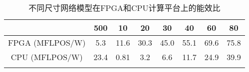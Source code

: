 \begin{center}
	\begin{table}[ht]
	\caption{不同尺寸网络模型在FPGA和CPU计算平台上的能效比}
	\renewcommand\arraystretch{1.2}
	\setlength{\tabcolsep}{12pt}
		\begin{tabular}{cccccccc}
	\toprule
						&	500		&	10		&	20		&	30		&	40		&	60		&	80		\\	\midrule
		FPGA (MFLPOS/W)	&	5.3		&	11.6	&	30.3	&	45.0	&	55.1	&	69.6	&	75.8	 \\	\hline
		CPU  (MFLPOS/W)	&	23.4	&	0.81	&	3.2		&	6.6		&	11.7	&	24.9	&	39.9	\\	
	\bottomrule
	\label{tab:Efficiency}
	\end{tabular}
\end{table}
\vspace{-3em}
\end{center}
